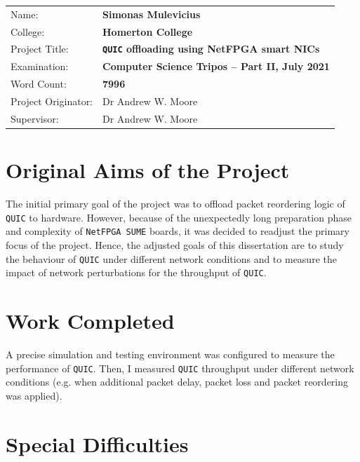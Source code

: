 \documentclass[12pt,a4paper,twoside,openright]{report}
\begin{document}
{\large
\begin{tabular}{ll}
Name:               & \bf Simonas Mulevicius                       \\
College:            & \bf Homerton College                     \\
Project Title:      & \bf \texttt{QUIC} offloading using NetFPGA smart NICs \\
Examination:        & \bf Computer Science Tripos -- Part II, July 2021  \\
Word Count:         & \bf 7996\footnotemark[1] \\
Project Originator: & Dr Andrew W. Moore                \\
Supervisor:         & Dr Andrew W. Moore                \\ 
\end{tabular}
}



\section*{Original Aims of the Project}

The initial primary goal of the project was to offload packet reordering logic of \texttt{QUIC} to hardware.
However, because of the unexpectedly long preparation phase and complexity of \texttt{NetFPGA SUME} boards, it was decided to readjust the primary focus of the project.
Hence, the adjusted goals of this dissertation are to study the behaviour of \texttt{QUIC} under different network conditions and to measure the impact of network perturbations for the throughput of \texttt{QUIC}.

\section*{Work Completed}

A precise simulation and testing environment was configured to measure the performance of \texttt{QUIC}.
Then, I measured \texttt{QUIC} throughput under different network conditions (e.g. when additional packet delay, packet loss and packet reordering was applied).

\section*{Special Difficulties}
\end{document}
